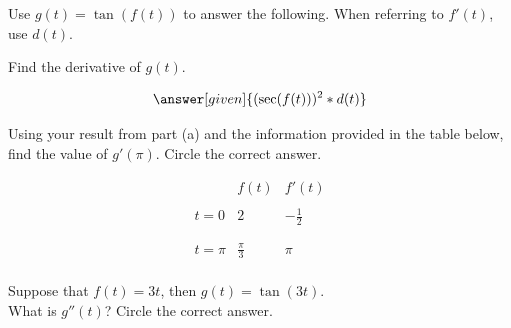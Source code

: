 \documentclass[handout]{ximera}
\begin{document}
\begin{problem}
Use $g(t)=\tan(f(t))$ to answer the following. When referring to $f'(t)$, use $d(t)$.

	\begin{question}
	Find the derivative of $g(t)$.
	
    \[
    \answer[given]{(\sec(f(t)))^2 * d(t)}
    \]
    \end{question}
    
	
	\begin{question}
    Using your result from part (a) and the information provided in the table below, find the value of $g'(\pi)$. Circle the correct answer.

\[
    \begin{array}{c||c|c}
	\, & f(t) & f'(t)\\
     \hline\hline
	\, & \, & \, \\
	t=0 & 2 & -\frac{1}{2}\\
	\, & \, & \, \\
	\hline
	\, & \, & \, \\
	t=\pi & \frac{\pi}{3} & \pi\\
    \end{array}
\]
	
    \begin{multipleChoice}
    \end{multipleChoice}
    \end{question}
\end{problem}



\begin{problem}
Suppose that $f(t)=3t$, then $g(t)=\tan(3t)$.\\

What is $g''(t)$? Circle the correct answer.

\begin{multipleChoice}
\end{multipleChoice}
\end{problem}
\end{document}
